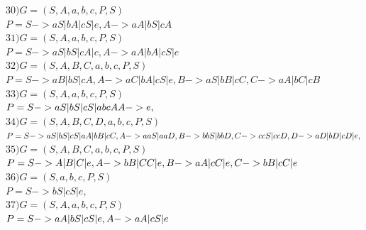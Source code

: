 \documentclass[a4paper,12pt]{article}
\begin{document}
$30) G = ({S,A}, {a,b,c}, P, S)$ \\
$P = { S-> aS | bA | cS | e,
A -> aA | bS | cA
}$ \\

$31) G = ({S,A}, {a,b,c}, P, S)$ \\
    $P = { S-> aS | bS | cA | c,
    A -> aA | bA | cS | e
    }$ \\

$32) G = ({S,A,B,C}, {a,b,c}, P, S)$ \\
    $P = { 
    S -> aB | bS | cA,
    A -> aC | bA | cS | e,
    B -> aS | bB | cC,
    C -> aA | bC | cB
    }$ \\
    
$33) G = ({S,A}, {a,b,c}, P, S)$ \\
    $P = { 
        S -> aS | bS | cS | abcA \\
        A -> e,
        }$ \\
        
        $34) G = ({S,A,B,C,D}, {a,b,c}, P, S)$ \\
        $P = { 
            S -> aS | bS | cS | aA | bB | cC, \\
            A -> aaS | aaD, \\
            B -> bbS | bbD, \\
            C -> ccS | ccD, \\
            D -> aD | bD | cD | e, \\
            }$ \\
            
            $35) G = ({S,A,B,C}, {a,b,c}, P, S)$ \\
            $P = { 
                S -> A | B | C | e, \\
                A -> bB | CC | e, \\
                B -> aA | cC | e, \\
                C -> bB | cC | e \\
                }$ \\
                
                $36) G = ({S}, {a,b,c}, P, S)$ \\
                $P = { 
                    S -> bS | cS | e,
                    }$ \\
                    
                    $37) G = ({S, A}, {a,b,c}, P, S)$ \\
                    $P = { 
                        S -> aA |bS | cS | e, \\
                        A -> aA | cS | e \\
                        }$ \\
                        
\end{document}
